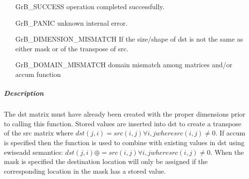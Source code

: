 \begin{itemize}[leftmargin=2.1in]
\item[{\sf GrB\_SUCCESS}]     operation completed successfully.
\item[{\sf GrB\_PANIC}]        unknown internal error.
\item[{\sf GrB\_DIMENSION\_MISMATCH}]      
        If the size/shape of dst is not the same as either mask or
        of the transpose of src.
\item[{\sf GrB\_DOMAIN\_MISMATCH}]  
        domain mismatch among matrices and/or
        accum function 
\end{itemize}

\subparagraph{Description}

The dst matrix must have already been created with the proper dimensions
prior to calling this function.  Stored values are inserted into dst to
create a transpose of the src matrix where 
$dst(j,i) = src(i,j) \forall i,j where src(i,j) \neq 0$.
If accum is specified then the function is used to combine with existing values in dst using ewiseadd semantics:
$dst(j,i) \oplus = src(i,j) \forall i,j where src(i,j) \neq 0$.
When the mask is specified the destination location will only be assigned if the corresponding location in the mask has a stored value.

